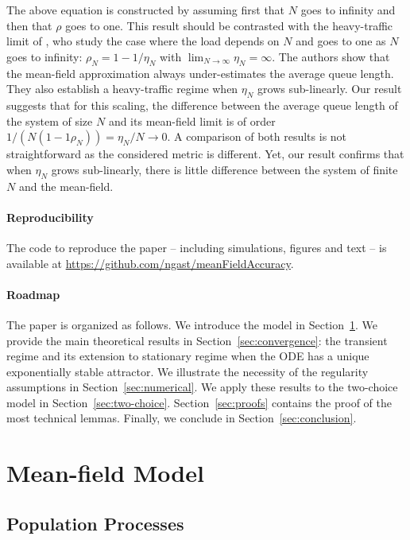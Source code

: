 \documentclass[acmlarge]{acmart}
\begin{document}
The above equation is constructed by assuming first that $N$ goes to
infinity and then that $\rho$ goes to one. This result should be
contrasted with the heavy-traffic limit of
\cite{eschenfeldt2016supermarket}, who study the case where the load
depends on $N$ and goes to one as $N$ goes to infinity:
$\rho_N=1-1/\eta_N$ with $\lim_{N\to\infty}\eta_N=\infty$. The authors
show that the mean-field approximation always under-estimates the
average queue length.  They also establish a heavy-traffic regime when
$\eta_N$ grows sub-linearly.  Our result suggests that for this
scaling, the difference between the average queue length of the system
of size $N$ and its mean-field limit is of order
$1/(N(1-1\rho_N))=\eta_N/N\to0$. A comparison of both results is not
straightforward as the considered metric is different. Yet, our result
confirms that when $\eta_N$ grows sub-linearly, there is little
difference between the system of finite $N$ and the mean-field.


\newcommand\githublink{\url{https://github.com/ngast/meanFieldAccuracy}}
\paragraph*{Reproducibility} The code to reproduce the paper --
including simulations, figures and text -- is available at
\githublink. 


\paragraph*{Roadmap} The paper is organized as follows. We introduce
the model in Section~\ref{sec:model}.  We provide the main theoretical
results in Section~\ref{sec:convergence}: the transient regime and its
extension to stationary regime when the ODE has a unique exponentially
stable attractor.
We illustrate the necessity of the regularity assumptions in
Section~\ref{sec:numerical}. We apply these results to the two-choice
model in Section~\ref{sec:two-choice}. Section~\ref{sec:proofs}
contains the proof of the most technical lemmas. 
Finally, we conclude
in Section~\ref{sec:conclusion}.



\section{Mean-field Model}
\label{sec:model}


\subsection{Population Processes}
\end{document}
